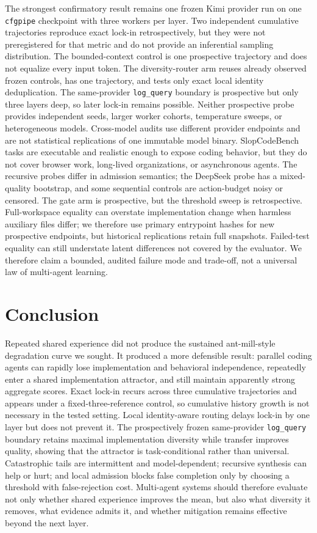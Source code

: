 \documentclass[letterpaper]{article}
\begin{document}
The strongest confirmatory result remains one frozen Kimi provider run on one
\texttt{cfgpipe} checkpoint with three workers per layer. Two independent
cumulative trajectories reproduce exact lock-in retrospectively, but they were
not preregistered for that metric and do not provide an inferential sampling
distribution. The bounded-context control is one prospective trajectory and does
not equalize every input token. The diversity-router arm reuses already observed
frozen controls, has one trajectory, and tests only exact local identity
deduplication. The same-provider \texttt{log\_query} boundary is prospective but
only three layers deep, so later lock-in remains possible. Neither prospective
probe provides independent seeds, larger worker cohorts, temperature sweeps, or
heterogeneous models. Cross-model audits use different provider endpoints and are
not statistical replications of one immutable model binary.
SlopCodeBench tasks are executable and realistic enough to expose coding behavior,
but they do not cover browser work, long-lived organizations, or asynchronous
agents. The recursive probes differ in admission semantics; the DeepSeek probe has
a mixed-quality bootstrap, and some sequential controls are action-budget noisy or
censored. The gate arm is prospective, but the threshold sweep is retrospective.
Full-workspace equality can overstate implementation change when harmless
auxiliary files differ; we therefore use primary entrypoint hashes for new
prospective endpoints, but historical replications retain full snapshots.
Failed-test equality can still understate latent differences not covered by the
evaluator. We therefore claim a bounded, audited failure mode and trade-off, not
a universal law of multi-agent learning.

\section{Conclusion}

Repeated shared experience did not produce the sustained ant-mill-style degradation
curve we sought. It produced a more defensible result: parallel coding agents can
rapidly lose implementation and behavioral independence, repeatedly enter a
shared implementation attractor, and still maintain apparently strong aggregate
scores. Exact lock-in recurs across three cumulative trajectories and appears
under a fixed-three-reference control, so cumulative history growth is not
necessary in the tested setting. Local identity-aware routing delays lock-in by
one layer but does not prevent it. The prospectively frozen same-provider
\texttt{log\_query} boundary retains maximal implementation diversity while
transfer improves quality, showing that the attractor is task-conditional rather
than universal. Catastrophic tails are intermittent and model-dependent;
recursive synthesis can help or hurt; and local admission blocks false completion
only by choosing a threshold with false-rejection cost. Multi-agent systems should
therefore evaluate not only whether shared experience improves the mean, but also
what diversity it removes, what evidence admits it, and whether mitigation remains
effective beyond the next layer.


\end{document}
